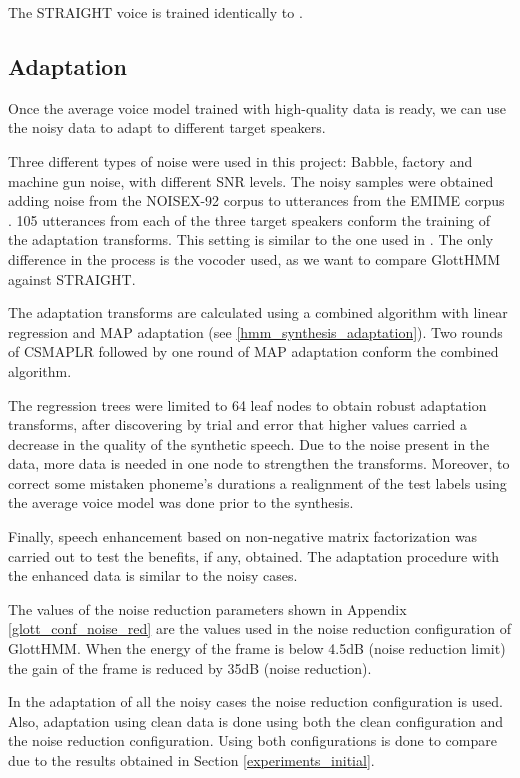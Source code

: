 The STRAIGHT voice is trained identically to \cite{karhila_jstsp_14}.

\subsection{Adaptation}
\label{experiments_adaptation}
Once the average voice model trained with high-quality data is ready, we can use the noisy data to adapt to different target speakers.

Three different types of noise were used in this project: Babble, factory and machine gun noise, with different SNR levels.
%
The noisy samples were obtained adding noise from the NOISEX-92 corpus \cite{Varga1993247} to utterances from the EMIME corpus \cite{wester_accent2010}.
%
105 utterances from each of the three target speakers conform the training of the adaptation transforms.
%
This setting is similar to the one used in \cite{karhila_jstsp_14}.
%
The only difference in the process is the vocoder used, as we want to compare GlottHMM against STRAIGHT.

The adaptation transforms are calculated using a combined algorithm with linear regression and MAP adaptation (see \ref{hmm_synthesis_adaptation}).
%
Two rounds of CSMAPLR followed by one round of MAP adaptation conform the combined algorithm.

The regression trees were limited to 64 leaf nodes to obtain robust adaptation transforms, after discovering by trial and error that higher values carried a decrease in the quality of the synthetic speech.
%
Due to the noise present in the data, more data is needed in one node to strengthen the transforms.
%
Moreover, to correct some mistaken phoneme's durations a realignment of the test labels using the average voice model was done prior to the synthesis.

Finally, speech enhancement based on non-negative matrix factorization \cite{raj_interspeech2010} was carried out to test the benefits, if any, obtained.
%
The adaptation procedure with the enhanced data is similar to the noisy cases.

The values of the noise reduction parameters shown in Appendix \ref{glott_conf_noise_red} are the values used in the noise reduction configuration of GlottHMM.
%
When the energy of the frame is below 4.5dB (noise reduction limit) the gain of the frame is reduced by 35dB (noise reduction).

In the adaptation of all the noisy cases the noise reduction configuration is used.
%
Also, adaptation using clean data is done using both the clean configuration and the noise reduction configuration.
%
Using both configurations is done to compare due to the results obtained in Section \ref{experiments_initial}.

